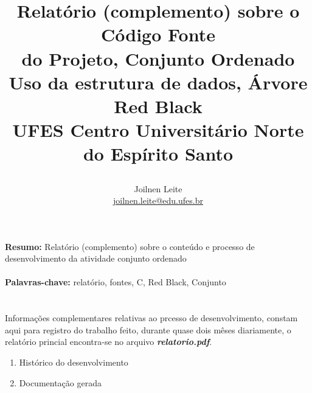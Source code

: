 \documentclass [a4paper, 12pt] {article}
\newcommand{\enf}[1]{\emph{\textbf{#1}}}
\begin{document}
\normalfont

\title {
    \Large{\textbf{Relatório (complemento) sobre o Código Fonte}} \\
    \Large{\textbf{do Projeto, Conjunto Ordenado}} \\
    \large{\textbf{Uso da estrutura de dados, Árvore Red Black}} \\
    \large {UFES Centro Universitário Norte do Espírito Santo}
    \author{Joilnen Leite \\ \href{mailto:joilnen.leite@edu.ufes.br}
    {\color{blue}joilnen.leite@edu.ufes.br}}
    \date{}
} 
\maketitle 

\noindent \textbf{Resumo: } Relatório (complemento) sobre o conteúdo e processo de desenvolvimento 
da atividade conjunto ordenado \\
\ \\
\noindent \textbf{Palavras-chave: } relatório, fontes, C, Red Black, Conjunto\\
\ \\
\ \\
\small
Informações complementares relativas ao prcesso de desenvolvimento, constam aqui 
para registro do trabalho feito, durante quase dois mêses diariamente, 
o relatório princial encontra-se no arquivo \enf{relatorio.pdf}.

\begin{enumerate} 
    \item Histórico do desenvolvimento
    \item Documentação gerada
\end{enumerate}
\end{document}
